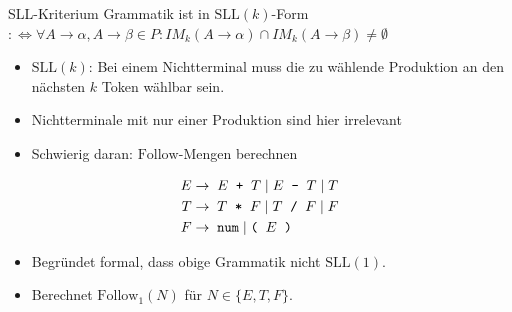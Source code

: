 \documentclass{beamer}
\begin{document}
\begin{frame}{SLL-Kriterium}
	Grammatik ist in $\textrm{SLL}(k)$-Form\\
	$:\Leftrightarrow \forall A \to \alpha, A \to \beta \in P: IM_k(A \to \alpha) \cap IM_k(A \to \beta) \neq \emptyset$

	\begin{itemize}
		\item $\textrm{SLL}(k)$: Bei einem Nichtterminal muss die zu wählende Produktion an den nächsten $k$ Token wählbar sein.
		\item Nichtterminale mit nur einer Produktion sind hier irrelevant
		\item Schwierig daran: $\textrm{Follow}$-Mengen berechnen
	\end{itemize}
	\pause
	\begin{align*}
		E \to & \;\; E \;\; \textrm{\texttt{+}} \;\; T \mid E \;\; \textrm{\texttt{-}} \;\; T \mid T\\
		T \to & \;\; T \;\; \textrm{\texttt{*}} \;\; F \mid T \;\; \textrm{\texttt{/}} \;\; F \mid F\\
		F \to & \;\; \textrm{\texttt{num}} \; | \; \textrm{\texttt{(}} \;\; E \;\; \textrm{\texttt{)}}
	\end{align*}
	
	\begin{itemize}
		\item Begründet formal, dass obige Grammatik nicht $\textrm{SLL}(1)$.
		\item Berechnet $\textrm{Follow}_1(N)$ für $N \in \{ E, T, F \}$.
	\end{itemize}
\end{frame}
\end{document}
